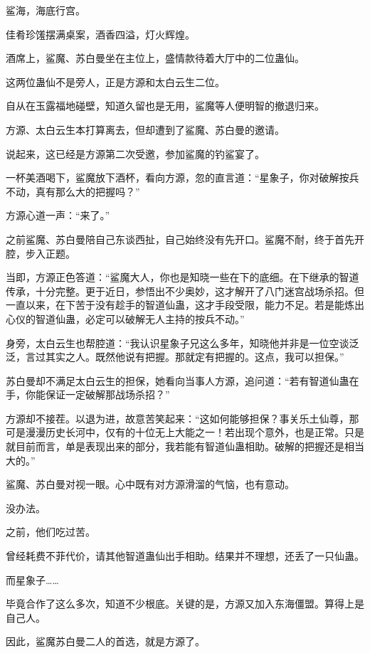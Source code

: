 
\begin{this_body}

鲨海，海底行宫。

佳肴珍馐摆满桌案，酒香四溢，灯火辉煌。

酒席上，鲨魔、苏白曼坐在主位上，盛情款待着大厅中的二位蛊仙。

这两位蛊仙不是旁人，正是方源和太白云生二位。

自从在玉露福地碰壁，知道久留也是无用，鲨魔等人便明智的撤退归来。

方源、太白云生本打算离去，但却遭到了鲨魔、苏白曼的邀请。

说起来，这已经是方源第二次受邀，参加鲨魔的钓鲨宴了。

一杯美酒喝下，鲨魔放下酒杯，看向方源，忽的直言道：“星象子，你对破解按兵不动，真有那么大的把握吗？”

方源心道一声：“来了。”

之前鲨魔、苏白曼陪自己东谈西扯，自己始终没有先开口。鲨魔不耐，终于首先开腔，步入正题。

当即，方源正色答道：“鲨魔大人，你也是知晓一些在下的底细。在下继承的智道传承，十分完整。更于近日，参悟出不少奥妙，这才解开了八门迷宫战场杀招。但一直以来，在下苦于没有趁手的智道仙蛊，这才手段受限，能力不足。若是能炼出心仪的智道仙蛊，必定可以破解无人主持的按兵不动。”

身旁，太白云生也帮腔道：“我认识星象子兄这么多年，知晓他并非是一位空谈泛泛，言过其实之人。既然他说有把握。那就定有把握的。这点，我可以担保。”

苏白曼却不满足太白云生的担保，她看向当事人方源，追问道：“若有智道仙蛊在手，你能保证一定破解那战场杀招？”

方源却不接茬。以退为进，故意苦笑起来：“这如何能够担保？事关乐土仙尊，那可是漫漫历史长河中，仅有的十位无上大能之一！若出现个意外，也是正常。只是就目前而言，单是表现出来的部分，我若能有智道仙蛊相助。破解的把握还是相当大的。”

鲨魔、苏白曼对视一眼。心中既有对方源滑溜的气恼，也有意动。

没办法。

之前，他们吃过苦。

曾经耗费不菲代价，请其他智道蛊仙出手相助。结果并不理想，还丢了一只仙蛊。

而星象子……

毕竟合作了这么多次，知道不少根底。关键的是，方源又加入东海僵盟。算得上是自己人。

因此，鲨魔苏白曼二人的首选，就是方源了。


\end{this_body}
